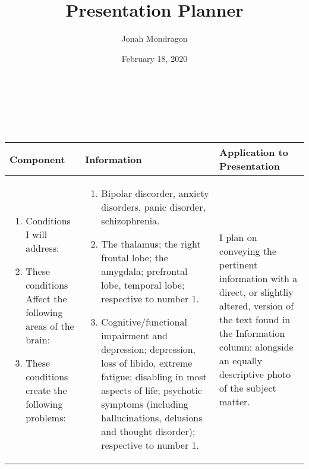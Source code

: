 \documentclass{article}
\renewcommand{\maketitle}{
    \begin{center}{\huge\bfseries\thetitle}
        \\ [0.5ex]
        \thedate
        \\ [0.5ex]
        \theauthor
        \\ [0.5ex]
        \hline
        \vspace{1.5cm}
    \end{center}
}
\begin{document}
\title{Presentation Planner}
\author{Jonah Mondragon}
\date{February 18, 2020}

\maketitle

\begin{center}
    \begin{longtable}[c]{|m{2in}|m{2in}|m{2in}|}
            \hline
            Component & Information & Application to Presentation \\
            \hline\hline
            \begin{enumerate}
                \item{Conditions I will address:}
                \item{These conditions Affect the following areas of the brain:}
                \item{These conditions create the following problems:}
            \end{enumerate}
            &
            \begin{enumerate}
                \item{Bipolar discorder, anxiety disorders, panic disorder, schizophrenia.}
                \item{The thalamus; the right frontal lobe; the amygdala; prefrontal lobe, temporal lobe; respective to number 1.}
                \item{Cognitive/functional impairment and depression; depression, loss of libido, extreme fatigue; disabling in most aspects of life; psychotic symptoms (including hallucinations, delusions and thought disorder); respective to number 1.}
            \end{enumerate}
            &
            I plan on conveying the pertinent information with a direct, or slightliy altered, version of the text found in the Information column; alongside an equally descriptive photo of the subject matter.
            \\
            \hline


\end{longtable}
\end{center}
\end{document}

